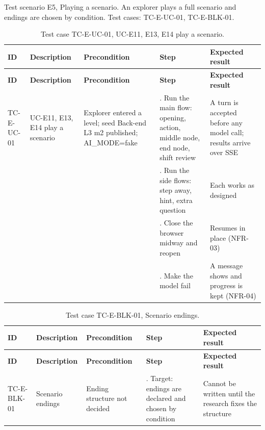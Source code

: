 Test scenario E5, Playing a scenario. An explorer plays a full scenario and endings are chosen by condition. Test cases: TC-E-UC-01, TC-E-BLK-01.

{\small
\begin{longtable}{|>{\raggedright\arraybackslash}p{}|>{\raggedright\arraybackslash}p{}|>{\raggedright\arraybackslash}p{}|>{\raggedright\arraybackslash}p{}|>{\raggedright\arraybackslash}p{}|}
\caption{Test case TC-E-UC-01, UC-E11, E13, E14 play a scenario.} \\
\hline
\textbf{ID} & \textbf{Description} & \textbf{Precondition} & \textbf{Step} & \textbf{Expected result} \\ \hline
\endfirsthead
\hline
\textbf{ID} & \textbf{Description} & \textbf{Precondition} & \textbf{Step} & \textbf{Expected result} \\ \hline
\endhead
TC-E-UC-01 & UC-E11, E13, E14 play a scenario & Explorer entered a level; seed Back-end L3 m2 published; AI\_MODE=fake & 1. Run the main flow: opening, action, middle node, end node, shift review & A turn is accepted before any model call; results arrive over SSE \\ \hline
 &  &  & 2. Run the side flows: step away, hint, extra question & Each works as designed \\ \hline
 &  &  & 3. Close the browser midway and reopen & Resumes in place (NFR-03) \\ \hline
 &  &  & 4. Make the model fail & A message shows and progress is kept (NFR-04) \\ \hline
\end{longtable}
}

{\small
\begin{longtable}{|>{\raggedright\arraybackslash}p{}|>{\raggedright\arraybackslash}p{}|>{\raggedright\arraybackslash}p{}|>{\raggedright\arraybackslash}p{}|>{\raggedright\arraybackslash}p{}|}
\caption{Test case TC-E-BLK-01, Scenario endings.} \\
\hline
\textbf{ID} & \textbf{Description} & \textbf{Precondition} & \textbf{Step} & \textbf{Expected result} \\ \hline
\endfirsthead
\hline
\textbf{ID} & \textbf{Description} & \textbf{Precondition} & \textbf{Step} & \textbf{Expected result} \\ \hline
\endhead
TC-E-BLK-01 & Scenario endings & Ending structure not decided & 1. Target: endings are declared and chosen by condition & Cannot be written until the research fixes the structure \\ \hline
\end{longtable}
}

